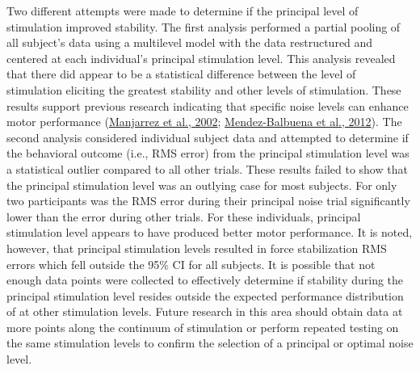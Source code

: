 \documentclass[]{cik}%
\begin{document}
Two different attempts were made to determine if the principal level of
stimulation improved stability. The first analysis performed a partial
pooling of all subject's data using a multilevel model with the data
restructured and centered at each individual's principal stimulation
level. This analysis revealed that there did appear to be a statistical
difference between the level of stimulation eliciting the greatest
stability and other levels of stimulation. These results support
previous research indicating that specific noise levels can enhance
motor performance (\protect\hyperlink{ref-Manjarrez2002}{Manjarrez et
al., 2002}; \protect\hyperlink{ref-Mendez-Balbuena2012}{Mendez-Balbuena
et al., 2012}). The second analysis considered individual subject data
and attempted to determine if the behavioral outcome (i.e., RMS error)
from the principal stimulation level was a statistical outlier compared
to all other trials. These results failed to show that the principal
stimulation level was an outlying case for most subjects. For only two
participants was the RMS error during their principal noise trial
significantly lower than the error during other trials. For these
individuals, principal stimulation level appears to have produced better
motor performance. It is noted, however, that principal stimulation
levels resulted in force stabilization RMS errors which fell outside the
95\% CI for all subjects. It is possible that not enough data points
were collected to effectively determine if stability during the
principal stimulation level resides outside the expected performance
distribution of at other stimulation levels. Future research in this
area should obtain data at more points along the continuum of
stimulation or perform repeated testing on the same stimulation levels
to confirm the selection of a principal or optimal noise level.
\end{document}
